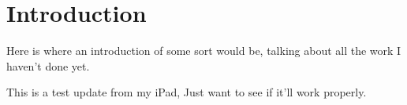 \chapter{Introduction}

\par Here is where an introduction of some sort would be, talking about all the work I haven't done yet.
\par This is a test update from my iPad, Just want to see if it'll work properly.